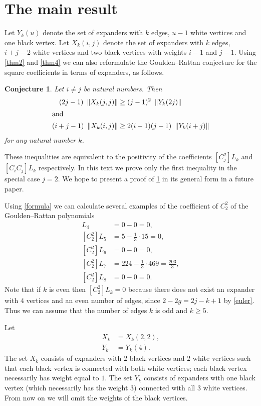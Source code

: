 \documentclass[submission]{FPSAC2021}
\newtheorem{con}{Conjecture}
\begin{document}
\section{The main result} 

Let $Y_k(u)$ denote the set of expanders 
with $k$ edges, $u-1$ white vertices and 
one black vertex. Let $X_k(i, j)$ denote 
the set of expanders with $k$ edges, 
$i+j-2$ white vertices and two black 
vertices with weights $i-1$ and $j-1$. 
Using  \cref{thm2} and \cref{thm4} we can 
also reformulate the Goulden--Rattan 
conjecture for the square coefficients 
in terms of expanders, as follows.
\begin{con} 
    \label{con:GJ2}
Let $i \neq j$ be natural numbers. Then 
\begin{align*}
(2j-1)\ \left\| X_k(j, j) \right\|    &   \geq (j-1)^2\ \left\| Y_k(2j) \right\| \\
\intertext{and}
(i+j-1)\ \left\| X_k(i, j) \right\|  & \geq 2(i-1)(j-1)\ \left\| Y_k(i+j) \right\|
\end{align*}
for any natural number $k$. 
\end{con}
These inequalities are equivalent to the 
positivity of the coefficients $[C_j^2] L_k$ 
and $[C_i C_j] L_k$ respectively. 
In this text we prove only the first 
inequality  in the special case 
$j=2$. We hope to present
a proof of \cref{con:GJ2} in its general 
form in a future paper.

Using \cref{formula} 
we can calculate several examples of 
the coefficient of $C_2^2$ of 
the Goulden--Rattan polynomials
\begin{align*}
[C_2^2] L_4 &=0-0=0,\\
[C_2^2] L_5 &=5-\frac{1}{3} \cdot 15=0,\\
[C_2^2] L_6 &=0-0=0, \\
[C_2^2] L_7 &=224-\frac{1}{3} \cdot 469=\frac{203}{3}, \\
[C_2^2] L_8 &=0-0=0. 
\end{align*}
Note that if $k$ is even then $[C_2^2] L_k=0$ because there does not exist an expander with $4$ vertices and an even number of edges, since
$2-2g=2j-k+1$ by \cref{euler}. Thus we can assume that the number of edges $k$ is odd and $k \geq 5$. 

Let 
\begin{align}
\label{xdef}
X_k &= X_k(2, 2), \\
\label{ydef}
Y_k &= Y_k(4).
\end{align}
The set $X_k$ consists of expanders with 
$2$ black vertices and $2$ white vertices
such that each black vertex is connected 
with both white vertices;
each black vertex necessarily has weight 
equal to $1$. The set $Y_k$ consists of 
expanders with one black vertex 
(which necessarily has the weight $3$) 
connected with all $3$ white vertices. 
From now on we will omit the weights 
of the black vertices.
\end{document}
